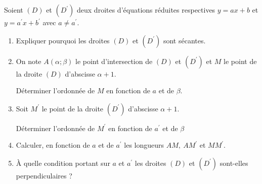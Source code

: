 
%
Soient $(D)$ et $(D^{\prime})$ deux droites d'équations réduites respectives $y=ax+b$ et $y=a^{\prime}x+b^{\prime}$ avec $a \neq a^{\prime}$.
\begin{enumerate}
     \item
     Expliquer pourquoi les droites $(D)$ et $(D^{\prime})$ sont sécantes.
     \item
     On note $A(\alpha ; \beta)$ le point d'intersection de $(D)$ et $(D^{\prime})$ et $M$ le point de la droite $(D)$ d'abscisse $\alpha + 1$.
     \par
     Déterminer l'ordonnée de $M$ en fonction de $a$ et de $\beta $.
     \item
     Soit $M^{\prime}$ le point de la droite $(D^{\prime})$ d'abscisse $\alpha + 1$.
     \par
     Déterminer l'ordonnée de $M^{\prime}$ en fonction de $a^{\prime}$ et de $\beta $
     \item
     Calculer, en fonction de $a$ et de $a^{\prime}$ les longueurs $AM,\ AM^{\prime}$ et $MM^{\prime}$.
     \item
     À quelle condition portant sur $a$ et $a^{\prime}$ les droites $(D)$ et $(D^{\prime})$ sont-elles perpendiculaires ?
\end{enumerate}
